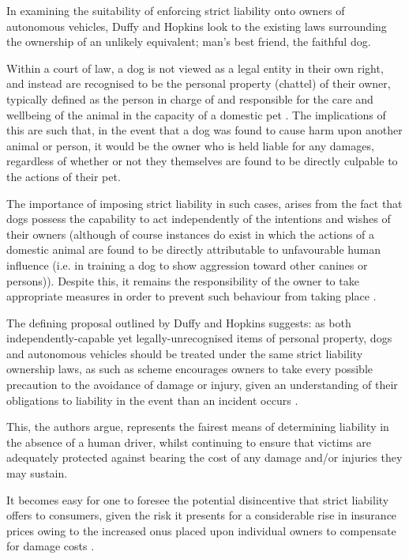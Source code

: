 \documentclass[conference]{IEEEtran}
\begin{document}
In examining the suitability of enforcing strict liability onto owners of autonomous vehicles, Duffy and Hopkins \cite{duffy} look to the existing laws surrounding the ownership of an unlikely equivalent; man's best friend, the faithful dog.

Within a court of law, a dog is not viewed as a legal entity in their own right,  and instead are recognised to be the personal property (chattel) of their owner, typically defined as the person in charge of and responsible for the care and wellbeing of the animal in the capacity of a domestic pet \cite{duffy}. The implications of this are such that, in the event that a dog was found to cause harm upon another animal or person, it would be the owner who is held liable for any damages, regardless of whether or not they themselves are found to be directly culpable to the actions of their pet. 

The importance of imposing strict liability in such cases, arises from the fact that dogs possess the capability to act independently of the intentions and wishes of their owners (although of course instances do exist in which the actions of a domestic animal are found to be directly attributable to unfavourable human influence (i.e. in training a dog to show aggression toward other canines or persons)). Despite this, it remains the responsibility of the owner to take appropriate measures in order to prevent such behaviour from taking place \cite{duffy}.

The defining proposal outlined by Duffy and Hopkins \cite{duffy} suggests: as both independently-capable yet legally-unrecognised items of personal property, dogs and autonomous vehicles should be treated under the same strict liability ownership laws, as such as scheme encourages owners to take every possible precaution to the avoidance of damage or injury, given an understanding of their obligations to liability in the event than an incident occurs \cite{duffy}. 

This, the authors argue, represents the fairest means of determining liability in the absence of a human driver, whilst continuing to ensure that victims are adequately protected against bearing the cost of any damage and/or injuries they may sustain. 

It becomes easy for one to foresee the potential disincentive that strict liability offers to consumers, given the risk it presents for a considerable rise in insurance prices owing to the increased onus placed upon individual owners to compensate for damage costs \cite{duffy}. 
\end{document}
